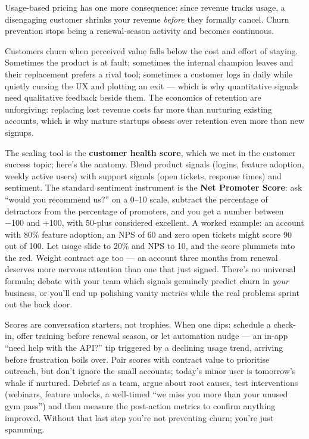 Usage-based pricing has one more consequence: since revenue tracks usage, a disengaging customer shrinks your revenue \emph{before} they formally cancel. Churn prevention stops being a renewal-season activity and becomes continuous.


Customers churn when perceived value falls below the cost and effort of staying. Sometimes the product is at fault; sometimes the internal champion leaves and their replacement prefers a rival tool; sometimes a customer logs in daily while quietly cursing the UX and plotting an exit — which is why quantitative signals need qualitative feedback beside them. The economics of retention are unforgiving: replacing lost revenue costs far more than nurturing existing accounts, which is why mature startups obsess over retention even more than new signups.


The scaling tool is the \textbf{customer health score}, which we met in the customer success topic; here's the anatomy. Blend product signals (logins, feature adoption, weekly active users) with support signals (open tickets, response times) and sentiment. The standard sentiment instrument is the \textbf{Net Promoter Score}: ask ``would you recommend us?'' on a 0–10 scale, subtract the percentage of detractors from the percentage of promoters, and you get a number between −100 and +100, with 50-plus considered excellent. A worked example: an account with 80\% feature adoption, an NPS of 60 and zero open tickets might score 90 out of 100. Let usage slide to 20\% and NPS to 10, and the score plummets into the red. Weight contract age too — an account three months from renewal deserves more nervous attention than one that just signed. There's no universal formula; debate with your team which signals genuinely predict churn in \emph{your} business, or you'll end up polishing vanity metrics while the real problems sprint out the back door.


Scores are conversation starters, not trophies. When one dips: schedule a check-in, offer training before renewal season, or let automation nudge — an in-app ``need help with the API?'' tip triggered by a declining usage trend, arriving before frustration boils over. Pair scores with contract value to prioritise outreach, but don't ignore the small accounts; today's minor user is tomorrow's whale if nurtured. Debrief as a team, argue about root causes, test interventions (webinars, feature unlocks, a well-timed ``we miss you more than your unused gym pass'') and then measure the post-action metrics to confirm anything improved. Without that last step you're not preventing churn; you're just spamming.


